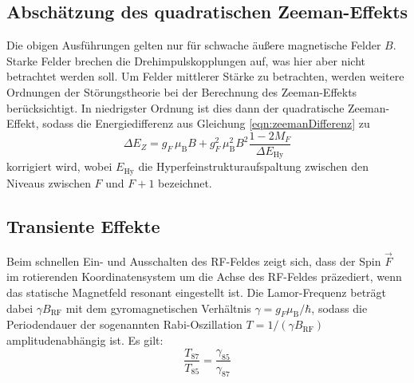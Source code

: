 \newpage
\subsection{Abschätzung des quadratischen Zeeman-Effekts}
\label{subsec:quadratischerZeeman}

Die obigen Ausführungen gelten nur für schwache äußere magnetische Felder $B$.
Starke Felder brechen die Drehimpulskopplungen auf, was hier aber nicht betrachtet werden soll.
Um Felder mittlerer Stärke zu betrachten, werden weitere Ordnungen der Störungstheorie bei der Berechnung des Zeeman-Effekts berücksichtigt. In niedrigster Ordnung ist dies dann der quadratische Zeeman-Effekt, sodass die Energiedifferenz aus Gleichung \eqref{eqn:zeemanDifferenz} zu
\begin{equation}
\Delta E_Z = g_F \, \mu_{\text{B}} B + g_F^2 \, \mu_{\text{B}}^2 B^2 \frac{1-2M_F}{\Delta E_{\text{Hy}}}
\label{eqn:zeemanDifferenzQuadratisch}
\end{equation}
korrigiert wird, wobei $E_\text{Hy}$ die Hyperfeinstrukturaufspaltung zwischen den Niveaus zwischen $F$ und $F+1$ bezeichnet.

\subsection{Transiente Effekte}
\label{subsec:transient}

Beim schnellen Ein- und Ausschalten des RF-Feldes zeigt sich, dass der Spin $\vec{F}$ im rotierenden Koordinatensystem um die Achse des RF-Feldes präzediert, wenn das statische Magnetfeld resonant eingestellt ist. Die Lamor-Frequenz beträgt dabei $\gamma B_{\text{RF}}$ mit dem gyromagnetischen Verhältnis $\gamma = g_F \mu_{\text{B}}/\hbar$, sodass die Periodendauer der sogenannten Rabi-Oszillation $T=1/(\gamma B_\text{RF})$ amplitudenabhängig ist.
Es gilt:
\begin{equation}
\frac{T_{87}}{T_{85}} = \frac{\gamma_{85}}{\gamma_{87}}
\label{eqn:transient}
\end{equation}